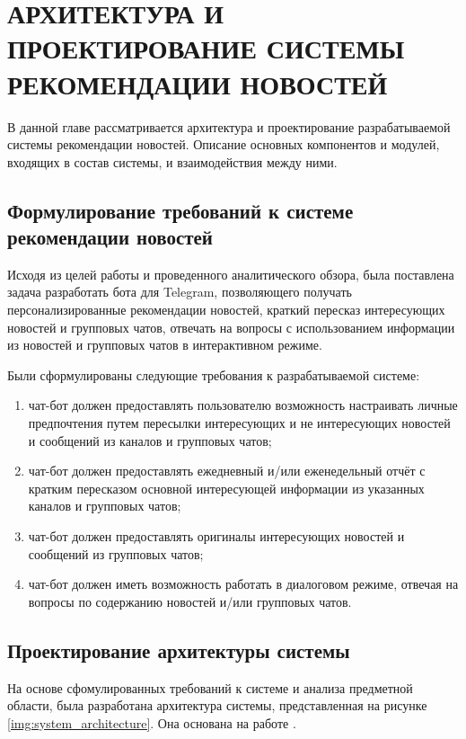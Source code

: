 \chapter{АРХИТЕКТУРА И ПРОЕКТИРОВАНИЕ СИСТЕМЫ РЕКОМЕНДАЦИИ НОВОСТЕЙ}

В данной главе рассматривается архитектура и проектирование разрабатываемой системы рекомендации новостей. Описание основных компонентов и модулей, входящих в состав системы, и взаимодействия между ними.

\section{Формулирование требований к системе рекомендации новостей}
Исходя из целей работы и проведенного аналитического обзора, была поставлена задача разработать бота для Telegram, позволяющего получать персонализированные рекомендации новостей, краткий пересказ интересующих новостей и групповых чатов, отвечать на вопросы с использованием информации из новостей и групповых чатов в интерактивном режиме.

Были сформулированы следующие требования к разрабатываемой системе:
\begin{enumerate}
    \item чат-бот должен предоставлять пользователю возможность настраивать личные предпочтения путем пересылки интересующих и не интересующих новостей и сообщений из каналов и групповых чатов;
    \item чат-бот должен предоставлять ежедневный и/или еженедельный отчёт с кратким пересказом основной интересующей информации из указанных каналов и групповых чатов;
    \item чат-бот должен предоставлять оригиналы интересующих новостей и сообщений из групповых чатов;
    \item чат-бот должен иметь возможность работать в диалоговом режиме, отвечая на вопросы по содержанию новостей и/или групповых чатов.
\end{enumerate}

\section{Проектирование архитектуры системы}

На основе сфомулированных требований к системе и анализа предметной области, была разработана архитектура системы, представленная на рисунке \ref{img:system_architecture}. Она основана на работе \cite{news_rec_gen}.

